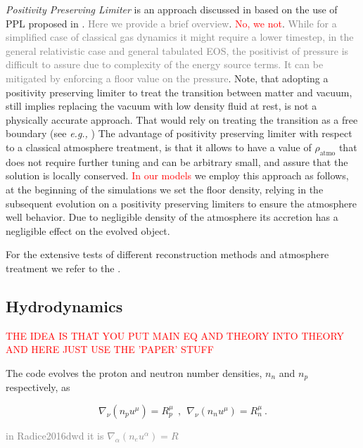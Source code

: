 \documentclass[11pt,a4paper,headinclude=true,DIV=14,BCOR=8mm,chapterprefix,listof=totoc,twoside,openright,abstracton]{scrbook}
\newcommand{\red}[1]{\textcolor{red}{#1}}
\newcommand{\gray}[1]{\textcolor{gray}{#1}}
\begin{document}
\textit{Positivity Preserving Limiter} is an approach discussed in \cite{Radice:2013apa} based on the use of PPL proposed in \cite{Hu:2013}. \gray{Here we provide a brief overview}. \red{No, we not}.
\gray{While for a simplified case of classical gas dynamics it might require a lower timestep, in the general relativistic case and general tabulated EOS, the positivist of pressure is difficult to assure due to complexity of the energy source terms. It can be mitigated by enforcing a floor value on the pressure}. 
Note, that adopting a positivity preserving limiter to treat the transition between matter and vacuum, still implies replacing the vacuum with low density fluid at rest, is not a physically accurate approach. That would rely on treating the transition as a free boundary (see \textit{e.g.,} \cite{Kastaun:2006}) The advantage of positivity preserving limiter with respect to a classical atmosphere treatment, is that it allows to have a value of $\rho_{\text{atmo}}$ that does not require further tuning and can be arbitrary small, and assure that the solution is locally conserved. 
\textcolor{red}{In our models} we employ this approach as follows, at the beginning of the simulations we set the floor density, relying in the subsequent evolution on a positivity preserving limiters to ensure the atmosphere well behavior. Due to negligible density of the atmosphere its accretion has a negligible effect on the evolved object. 

For the extensive tests of different reconstruction methods and atmosphere treatment we refer to the \cite{Radice:2013apa}.




\subsection{Hydrodynamics}



\red{THE IDEA IS THAT YOU PUT MAIN EQ AND THEORY INTO THEORY AND HERE JUST USE THE 'PAPER' STUFF}

The code evolves the proton and neutron number densities, $n_n$ and $n_p$
respectively, as 

\begin{equation}
\label{eq:wthc:pndens}
\nabla_\nu (n_p u^\mu) = R_p^\mu \ \ , \ \ 
\nabla_\nu (n_n u^\mu) = R_n^\mu \ .
\end{equation}

\gray{in Radice2016dwd it is $\nabla_{\alpha}(n_e u^{\alpha}) = R$}
\end{document}
